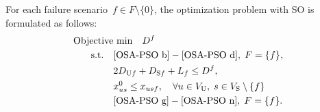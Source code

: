 \documentclass[10pt, letterpaper]{IEEEtran}
\newcommand\blue[1]{\textcolor{blue}{#1}}
\newcommand\red[1]{\textcolor{red}{#1}}
\begin{document}
\begin{CJK}{UTF8}{ipxm}
For each failure scenario~$f \in F \setminus \{0\}$, the optimization problem with SO is formulated as follows:
\blue{
\begin{subequations} \label{SO}
  \begin{align}
  \text{Objective}&\text{ min}\quad D^f \label{SO a} \\
  \rm{s.t.} \quad
  & \eqref{OSA-PSO b}-\eqref{OSA-PSO d}, \; F = \{f\}, \label{OSA-SO b-g} \\
  &2D_{\mathrm{U}f}+D_{\mathrm{S}f}+L_f \le D^f, \label{OSA-SO h} \\
  &x^0_{us} \le x_{usf}, \quad \forall u \in V_{\rm{U}}, \; s \in V_{\rm{S}} \setminus \{f\} \label{OSA-SO i} \\
  & \eqref{OSA-PSO g}-\eqref{OSA-PSO n}, \; F = \{f\}. \label{OSA-SO g-n}
  \end{align}
\end{subequations}
}

\end{CJK}
\end{document}
